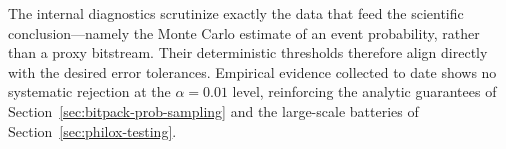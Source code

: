 The internal diagnostics scrutinize exactly the data that feed the scientific conclusion—namely the Monte Carlo estimate of an event probability, rather than a proxy bitstream.  Their deterministic thresholds therefore align directly with the desired error tolerances.  Empirical evidence collected to date shows no systematic rejection at the $\alpha=0.01$ level, reinforcing the analytic guarantees of Section~\ref{sec:bitpack-prob-sampling} and the large-scale batteries of Section~\ref{sec:philox-testing}.